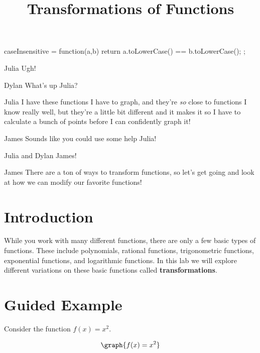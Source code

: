 \documentclass{ximera}
\title{Transformations of Functions}
\begin{document}
\maketitle
\begin{javascript}
 caseInsensitive = function(a,b) {
    return a.toLowerCase() == b.toLowerCase();
  };
\end{javascript}
\begin{dialogue}
\item[Julia] Ugh!
\item[Dylan] What's up Julia?
\item[Julia] I have these functions I have to graph, and they're \textit{so} close to functions I know really well, but they're a little bit different and it makes it so I have to calculate a bunch of points before I can confidently graph it!
\item[James] Sounds like you could use some help Julia!
\item[Julia and Dylan] James!
\item[James] There are a ton of ways to transform functions, so let's get going and look at how we can modify our favorite functions!
\end{dialogue}
\section{Introduction}
While you work with many different functions, there are only a few basic types of functions. These include polynomials, rational functions, trigonometric functions, exponential functions, and logarithmic functions. In this lab we will explore different variations on these basic functions called \textbf{transformations}.
\section{Guided Example}
Consider the function $f(x)=x^2$.

\[
\graph{f(x)=x^2}
\]
\end{document}
